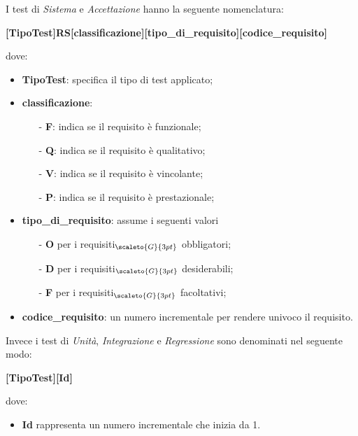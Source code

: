 I test di \textit{Sistema} e \textit{Accettazione} hanno la seguente nomenclatura:
\begin{center}
	\textbf{[TipoTest]RS[classificazione][tipo\_di\_requisito][codice\_requisito]}
\end{center}
dove:
\begin{itemize}
	\item \textbf{TipoTest}: specifica il tipo di test applicato;
	\item \textbf{classificazione}:
	\begin{itemize}
		\item[-] \textbf{F}: indica se il requisito è funzionale;
		\item[-] \textbf{Q}: indica se il requisito è qualitativo;
		\item[-] \textbf{V}: indica se il requisito è vincolante;
		\item[-] \textbf{P}: indica se il requisito è prestazionale;
	\end{itemize}
	\item \textbf{tipo\_di\_requisito}: assume i seguenti valori
		\begin{itemize}
			\item[-] \textbf{O} per i requisiti$_{\scaleto{G}{3pt}}$ obbligatori;
			\item[-] \textbf{D} per i requisiti$_{\scaleto{G}{3pt}}$ desiderabili;
			\item[-] \textbf{F} per i requisiti$_{\scaleto{G}{3pt}}$ facoltativi;
		\end{itemize}
	\item \textbf{codice\_requisito}: un numero incrementale per rendere univoco il requisito.
\end{itemize}

Invece i test di \textit{Unità}, \textit{Integrazione} e \textit{Regressione} sono denominati nel seguente modo:
\begin{center}
	\textbf{[TipoTest][Id]}
\end{center}
dove:
\begin{itemize}
	\item \textbf{Id} rappresenta un numero incrementale che inizia da 1.
\end{itemize}

